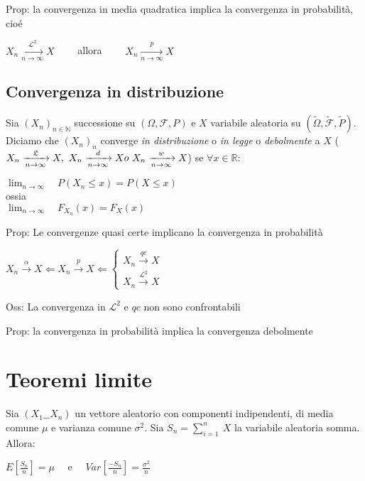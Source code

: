 \documentclass[12pt, a4paper]{article}
\begin{document}
Prop: la convergenza in media quadratica implica la convergenza in probabilità, cioé
\begin{center}
    $X_{n}\xrightarrow[n\to\infty]{\mathcal{L}^{2}}X\qquad$ allora $\qquad X_{n}\xrightarrow[n\to\infty]{p}X$
\end{center}

\subsection{Convergenza in distribuzione}
Sia $(X_{n})_{n\in\mathbb{N}}$ successione su $(\Omega,\mathcal{F},P)$ e $X$ variabile aleatoria su $(\tilde{\Omega}
,\tilde{\mathcal{F}},\tilde{P})$. Diciamo che $(X_{n})_{n}$ converge \textit{in distribuzione} o \textit{in legge}
o \textit{debolmente} a $X$ ($X_{n}\xrightarrow[n\to\infty]{\mathfrak{L}}X,\ 
X_{n}\xrightarrow[n\to\infty]{d}X\\o\ X_{n}\xrightarrow[n\to\infty]{w}X$) se $\forall x\in\mathbb{R}$:
\begin{center}
    $\lim_{n\to\infty}\quad P(X_{n}\leq x)=P(X\leq x)$\\
    ossia\\
    $\lim_{n\to\infty}\quad F_{X_{n}}(x)=F_{X}(x)$
\end{center}

Prop: Le convergenze quasi certe implicano la convergenza in probabilità
\begin{center}
    $X_{n}\xrightarrow{\alpha}X\Leftarrow X_{n}\xrightarrow{p}X\Leftarrow
    \begin{cases}
        X_{n}\xrightarrow{qc}X\\
        X_{n}\xrightarrow{\mathcal{L}^{2}}X    
    \end{cases}$
\end{center}

Oss: La convergenza in $\mathcal{L}^{2}$ e $qc$ non sono confrontabili

Prop: la convergenza in probabilità implica la convergenza debolmente

\section{Teoremi limite}
Sia $(X_{1}\_\_ X_{n})$ un vettore aleatorio con componenti indipendenti, di media comune $\mu$ e varianza comune
$\sigma^{2}$. Sia $S_{n}=\sum_{i=1}^{n}\ X$ la variabile aleatoria somma. Allora:
\begin{center}
    $E[\frac{S_{n}}{n}]=\mu\quad$ e $\quad Var[\frac{-S_{n}}{n}]=\frac{\sigma^{2}}{n}$
\end{center}
\end{document}
